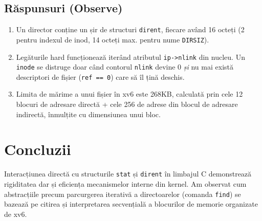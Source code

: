 \documentclass[12pt,a4paper]{article}
\begin{document}
\subsection{Răspunsuri (Observe)}
\begin{enumerate}
    \item Un director conține un șir de structuri \texttt{dirent}, fiecare având 16 octeți (2 pentru indexul de inod, 14 octeți max. pentru nume \texttt{DIRSIZ}).
    \item Legăturile hard funcționează iterând atributul \texttt{ip->nlink} din nucleu. Un \texttt{inode} se distruge doar când contorul \texttt{nlink} devine 0 \textit{și} nu mai există descriptori de fișier (\texttt{ref == 0}) care să îl țină deschis.
    \item Limita de mărime a unui fișier în xv6 este 268KB, calculată prin cele 12 blocuri de adresare directă + cele 256 de adrese din blocul de adresare indirectă, înmulțite cu dimensiunea unui bloc.
\end{enumerate}

\section{Concluzii}
Interacțiunea directă cu structurile \texttt{stat} și \texttt{dirent} în limbajul C demonstrează rigiditatea dar și eficiența mecanismelor interne din kernel. Am observat cum abstracțiile precum parcurgerea iterativă a directoarelor (comanda \texttt{find}) se bazează pe citirea și interpretarea secvențială a blocurilor de memorie organizate de xv6.
\end{document}
